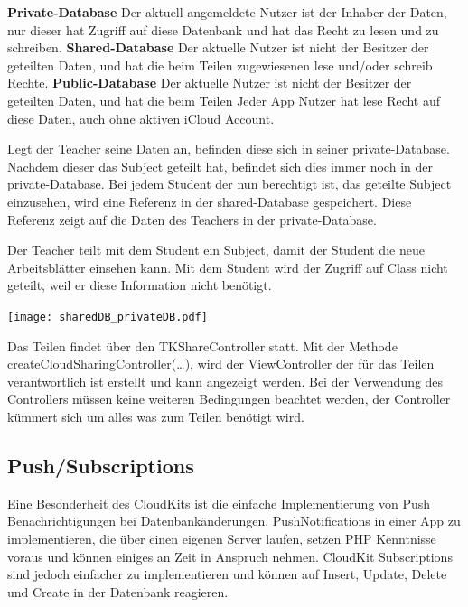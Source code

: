 \textbf{Private-Database}
\newline
Der aktuell angemeldete Nutzer ist der Inhaber der Daten, nur dieser hat Zugriff auf diese Datenbank und hat das Recht zu lesen und zu schreiben.
\newline
\textbf{Shared-Database}
\newline
Der aktuelle Nutzer ist nicht der Besitzer der geteilten Daten, und hat die beim Teilen zugewiesenen lese und/oder schreib Rechte.
\newline
\textbf{Public-Database}
\newline
Der aktuelle Nutzer ist nicht der Besitzer der geteilten Daten, und hat die beim Teilen Jeder App Nutzer hat lese Recht auf diese Daten, auch ohne aktiven iCloud Account.
\newline

Legt der Teacher seine Daten an, befinden diese sich in seiner private-Database. Nachdem dieser das Subject geteilt hat, befindet sich dies immer noch in der private-Database. Bei jedem Student der nun berechtigt ist, das geteilte Subject einzusehen, wird eine Referenz in der shared-Database gespeichert. Diese Referenz zeigt auf die Daten des Teachers in der private-Database.

Der Teacher teilt mit dem Student ein Subject, damit der Student die neue Arbeitsblätter einsehen kann. Mit dem Student wird der Zugriff auf Class nicht geteilt, weil er diese Information nicht benötigt.

\begin{center}
   \texttt{[image: sharedDB\_privateDB.pdf]}
\end{center}

Das Teilen findet über den TKShareController statt. Mit der Methode createCloudSharingController(…), wird der ViewController der für das Teilen verantwortlich ist erstellt und kann angezeigt werden.
Bei der Verwendung des Controllers müssen keine weiteren Bedingungen beachtet werden, der Controller kümmert sich um alles was zum Teilen benötigt wird.

\subsection{Push/Subscriptions}

Eine Besonderheit des CloudKits ist die einfache Implementierung von Push Benachrichtigungen bei Datenbankänderungen. PushNotifications in einer App zu implementieren, die über einen eigenen Server laufen, setzen PHP Kenntnisse voraus und können einiges an Zeit in Anspruch nehmen.
CloudKit Subscriptions sind jedoch einfacher zu implementieren und können auf Insert, Update, Delete und Create in der Datenbank reagieren.

